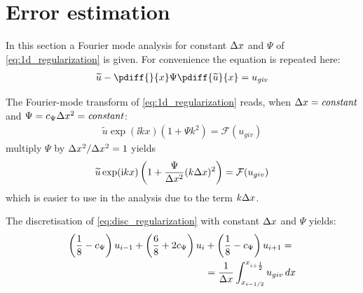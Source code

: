 \chapter{Error estimation}\label{sec:error_estimation}
In this section a Fourier mode analysis for constant $\Delta x$ and $\Psi$ of \autoref{eq:1d_regularization} is given.
For convenience the equation is repeated here:
%
\begin{align}
    \widetilde u - \pdiff{}{x}  \Psi \pdiff{\widetilde u}{x} = u_{\it{giv}}
\end{align}

The Fourier-mode transform of \autoref{eq:1d_regularization} reads, when $\Delta x = \it{constant}$ and $\Psi = c_{\Psi} \Delta x^2 = \it{constant}$:
\begin{align}
\widetilde u \exp(\ii k x) \left( 1 + \Psi k^2 \right) = \mathcal{F}(u_{giv})
\end{align}
multiply $\Psi$ by $\Delta x^2/\Delta x^2 = 1$ yields
\begin{align}
\widetilde u \exp({\rm i} k x) \left( 1 + \frac{\Psi}{\Delta x^2} (k\Delta x)^2 \right) = \mathcal{F}(u_{giv})
\label{eq:F_regularization}
\end{align}
which is easier to use in the analysis due to the term $k\Delta x$.

The discretisation of \autoref{eq:disc_regularization} with constant $\Delta x$ and $\Psi$ yields:
\begin{align}
\left( \frac{1}{8}
- c_{\Psi} \right)  u_{i-1}
+ \left( \frac{6}{8} + 2c_{\Psi}\right)  u_i & +
\left(  \frac{1}{8} - c_{\Psi} \right)  u_{i+1}  =
\\
& = \frac{1}{\Delta x}\int_{x_{i-1/2}}^{x_{i+\frac{1}{2}}} u_{giv}\, dx
\end{align}

